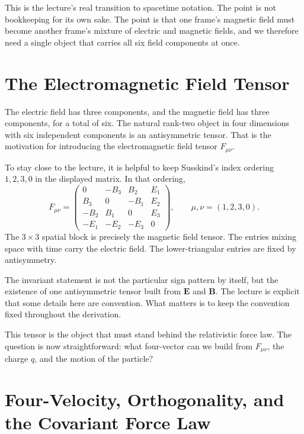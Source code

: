 This is the lecture's real transition to spacetime notation. The point is not bookkeeping for its own sake. The point is that one frame's magnetic field must become another frame's mixture of electric and magnetic fields, and we therefore need a single object that carries all six field components at once.

\section{The Electromagnetic Field Tensor}

The electric field has three components, and the magnetic field has three components, for a total of six. The natural rank-two object in four dimensions with six independent components is an antisymmetric tensor. That is the motivation for introducing the electromagnetic field tensor \(F_{\mu\nu}\).

To stay close to the lecture, it is helpful to keep Susskind's index ordering \(1,2,3,0\) in the displayed matrix. In that ordering,
\begin{equation}
F_{\mu\nu}
=
\begin{pmatrix}
0 & -B_3 & B_2 & E_1 \\
B_3 & 0 & -B_1 & E_2 \\
-B_2 & B_1 & 0 & E_3 \\
-E_1 & -E_2 & -E_3 & 0
\end{pmatrix},
\qquad
\mu,\nu=(1,2,3,0).
\end{equation}
The \(3\times 3\) spatial block is precisely the magnetic field tensor. The entries mixing space with time carry the electric field. The lower-triangular entries are fixed by antisymmetry.

\begin{remark}
The invariant statement is not the particular sign pattern by itself, but the existence of one antisymmetric tensor built from \(\mathbf E\) and \(\mathbf B\). The lecture is explicit that some details here are convention. What matters is to keep the convention fixed throughout the derivation.
\end{remark}

This tensor is the object that must stand behind the relativistic force law. The question is now straightforward: what four-vector can we build from \(F_{\mu\nu}\), the charge \(q\), and the motion of the particle?

\section{Four-Velocity, Orthogonality, and the Covariant Force Law}


